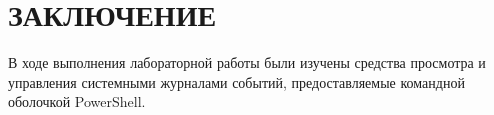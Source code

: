 \section*{ЗАКЛЮЧЕНИЕ}

В ходе выполнения лабораторной работы были изучены средства просмотра и
управления системными журналами событий, предоставляемые командной оболочкой
PowerShell.

\newpage
